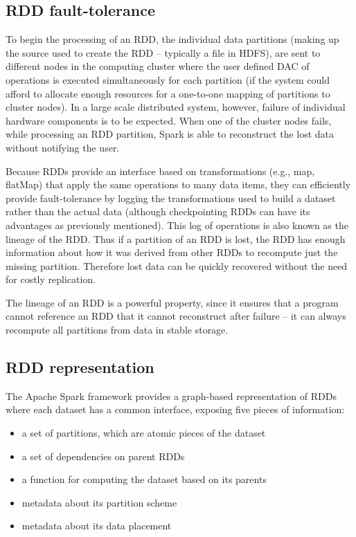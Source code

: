 \documentclass{l4proj}
\begin{document}
\subsection{RDD fault-tolerance}

To begin the processing of an RDD, the individual data partitions (making up the source used to create the RDD -- typically a file in HDFS), are sent to different nodes in the computing cluster where the user defined DAC of operations is executed simultaneously for each partition (if the system could afford to allocate enough resources for a one-to-one mapping of partitions to cluster nodes). In a large scale distributed system, however, failure of individual hardware components is to be expected. When one of the cluster nodes fails, while processing an RDD partition, Spark is able to reconstruct the lost data without notifying the user.

Because RDDs provide an interface based on transformations (e.g., map, flatMap) that apply the same operations to many data items, they can efficiently provide fault-tolerance by logging the transformations used to build a dataset rather than the actual data (although checkpointing RDDs can have its advantages as previously mentioned). This log of operations is also known as the lineage of the RDD. Thus if a partition of an RDD is lost, the RDD has enough information about how it was derived from other RDDs to recompute just the missing partition\cite{RDD}. Therefore lost data can be quickly recovered without the need for costly replication.

The lineage of an RDD is a powerful property, since it ensures that a program cannot reference an RDD that it cannot reconstruct after failure -- it can always recompute all partitions from data in stable storage.

\subsection{RDD representation}

The Apache Spark framework provides a graph-based representation of RDDs where each dataset has a common interface, exposing five pieces of information:

\begin{itemize}
\renewcommand{\labelitemi}{\scriptsize$\blacksquare$}
\item a set of partitions, which are atomic pieces of the dataset
\item a set of dependencies on parent RDDs
\item a function for computing the dataset based on its parents
\item metadata about its partition scheme
\item metadata about its data placement
\end{itemize}
\end{document}
